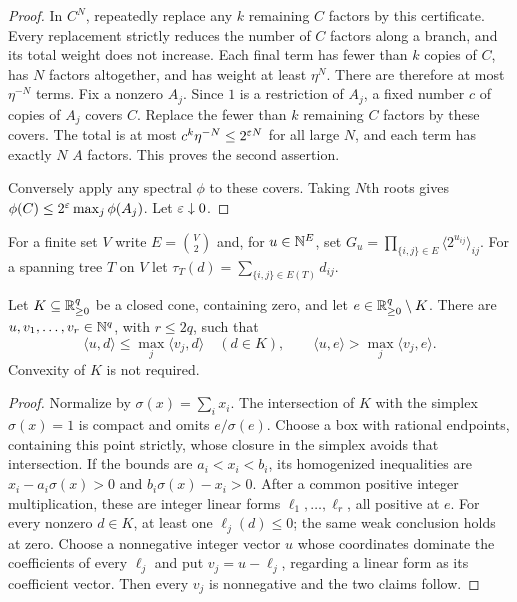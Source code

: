 \begin{proof}
In $C^N$, repeatedly replace any $k$ remaining $C$ factors
by this certificate. Every replacement strictly reduces the
number of $C$ factors along a branch, and its total weight
does not increase. Each final term has fewer than $k$ copies
of $C$, has $N$ factors altogether, and has weight at least
$\eta^N$. There are therefore at most $\eta^{-N}$ terms.
Fix a nonzero $A_j$. Since $1$ is a restriction of $A_j$,
a fixed number $c$ of copies of $A_j$ covers $C$.
Replace the fewer than $k$ remaining $C$ factors by these
covers. The total is at most $c^k\eta^{-N}\le2^{\varepsilon N}$
for all large $N$, and each term has exactly $N$ $A$ factors.
This proves the second assertion.

Conversely apply any spectral $\phi$ to these covers.
Taking $N$th roots gives
$\phi(C)\le2^\varepsilon\max_j\phi(A_j)$.
Let $\varepsilon\downarrow0$.
\end{proof}

For a finite set $V$ write $E=\binom V2$ and, for
$u\in\mathbb N^E$, set
$G_u=\prod_{\{i,j\}\in E}\langle2^{u_{ij}}\rangle_{ij}$.
For a spanning tree $T$ on $V$ let
$\tau_T(d)=\sum_{\{i,j\}\in E(T)}d_{ij}$.

\begin{lemma}\label{lem:coneseparation}
Let $K\subseteq\mathbb R_{\ge0}^q$ be a closed cone, containing zero,
and let $e\in\mathbb R_{\ge0}^q\setminus K$.
There are $u,v_1,\ldots,v_r\in\mathbb N^q$, with $r\le2q$, such that
\[
 \langle u,d\rangle\le\max_j\langle v_j,d\rangle\quad(d\in K),
 \qquad
 \langle u,e\rangle>\max_j\langle v_j,e\rangle.
\]
Convexity of $K$ is not required.
\end{lemma}

\begin{proof}
Normalize by $\sigma(x)=\sum_i x_i$.
The intersection of $K$ with the simplex $\sigma(x)=1$
is compact and omits $e/\sigma(e)$.
Choose a box with rational endpoints, containing this point
strictly, whose closure in the simplex avoids that intersection.
If the bounds are $a_i<x_i<b_i$, its homogenized inequalities
are $x_i-a_i\sigma(x)>0$ and $b_i\sigma(x)-x_i>0$.
After a common positive integer multiplication, these are
integer linear forms $\ell_1,\ldots,\ell_r$, all positive at $e$.
For every nonzero $d\in K$, at least one $\ell_j(d)\le0$;
the same weak conclusion holds at zero.
Choose a nonnegative integer vector $u$ whose coordinates
dominate the coefficients of every $\ell_j$ and put
$v_j=u-\ell_j$, regarding a linear form as its coefficient vector.
Then every $v_j$ is nonnegative and the two claims follow.
\end{proof}

